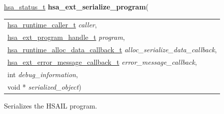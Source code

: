 \documentclass[final]{book}
\newcommand{\hsaarg}[1]{\textit{#1}}
\begin{document}
\noindent\begin{tcolorbox}[breakable,nobeforeafter,colframe=white,colback=lightgray,left=0mm]
\hyperlink{group__status_1gad755322e7ff95456520e8abdbe90d225}{hsa_status_t} \hypertarget{group__HsailLinkerServiceLayer_1ga55cc64d53d29bc3e2d20160c03117776}{\textbf{hsa_ext_serialize_program}}(
\vspace{-3.5mm}\begin{longtable}{@{}p{\textwidth}}
\hspace{1.7em}\hyperlink{group__RuntimeCommon_1ga7d9b1191602415f5dd3893985cc93826}{hsa_runtime_caller_t} \hsaarg{caller},\\
\hspace{1.7em}\hyperlink{group__HsailLinkerServiceLayer_1gaea8d90863414407ddba7e318db7412f9}{hsa_ext_program_handle_t} \hsaarg{program},\\
\hspace{1.7em}\hyperlink{group__RuntimeCommon_1ga30804c05fe32b4ab9da480280dba8cc5}{hsa_runtime_alloc_data_callback_t} \hsaarg{alloc_serialize_data_callback},\\
\hspace{1.7em}\hyperlink{group__FinalizerCoreApi_1gace3d3971c5289675c4f88ce0045db41f}{hsa_ext_error_message_callback_t} \hsaarg{error_message_callback},\\
\hspace{1.7em}int \hsaarg{debug_information},\\
\hspace{1.7em}void * \hsaarg{serialized_object})\end{longtable}

\end{tcolorbox}
Serializes the HSAIL program.
\end{document}
